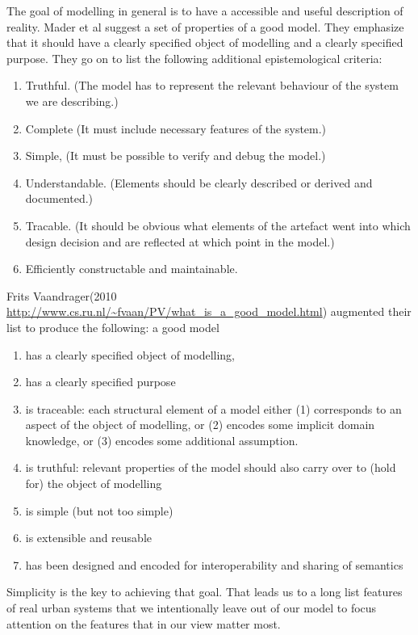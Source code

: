 The goal of modelling in general is to  have a accessible and useful description of reality.  Mader et al \cite{maderConstructionVerificationModels2007} suggest a set of properties of a good model. They emphasize that it should have a clearly specified object of modelling and  a clearly specified purpose. They go on to list the  following additional epistemological criteria:
\begin{enumerate}   
\item  Truthful. (The model has to represent the relevant behaviour of the system we are describing.) 
\item  Complete (It must include necessary features of the system.)
\item Simple,  (It must be possible to verify and debug the model.)
\item Understandable. (Elements should be clearly described or derived and documented.)
\item  Tracable.  (It should be obvious what elements of the artefact went into which design decision and are reflected at which point in the model.)
\item  Efficiently constructable and maintainable. 
\end{enumerate}



Frits Vaandrager(2010 \url{http://www.cs.ru.nl/~fvaan/PV/what_is_a_good_model.html})   augmented their list to produce the following: a good model \begin{enumerate}
     \item has a clearly specified object of modelling,
     \item  has a clearly specified purpose
     \item is traceable: each structural element of a model either (1) corresponds to an aspect of the object of modelling, or (2) encodes some implicit domain knowledge, or (3) encodes some additional assumption.
     \item  is truthful: relevant properties of the model should also carry over to (hold for) the object of modelling
     \item is simple (but not too simple)
     \item is extensible and reusable
     \item has been designed and encoded for interoperability and sharing of semantics
 \end{enumerate}


Simplicity is  the key to achieving that goal. That leads us to a long list  features of real urban systems that we intentionally leave out of  our model to focus attention on the features that in our view matter most. 

